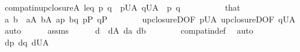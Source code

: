 \begin{isabellebody}
\ {\isachardoublequoteopen}compat{\isacharunderscore}{\kern0pt}in{\isacharparenleft}{\kern0pt}upclosure{\isacharparenleft}{\kern0pt}A{\isacharparenright}{\kern0pt}{\isacharcomma}{\kern0pt}\ leq{\isacharcomma}{\kern0pt}\ p{\isacharcomma}{\kern0pt}\ q{\isacharparenright}{\kern0pt}{\isachardoublequoteclose}\ \ {\isachardoublequoteopen}p{\isasymin}{\isacharquery}{\kern0pt}UA{\isachardoublequoteclose}\ {\isachardoublequoteopen}q{\isasymin}{\isacharquery}{\kern0pt}UA{\isachardoublequoteclose}\ \ p\ q\isanewline
\ \ \isamarkupfalse%
\ {\isacharminus}{\kern0pt}\isanewline
\ \ \ \ \isamarkupfalse%
\ that\isanewline
\ \ \ \ \isamarkupfalse%
\ a\ b\ \ {}{\isacharcolon}{\kern0pt}{\isachardoublequoteopen}a{\isasymin}A{\isachardoublequoteclose}\ {\isachardoublequoteopen}b{\isasymin}A{\isachardoublequoteclose}\ {\isachardoublequoteopen}a{\isasympreceq}p{\isachardoublequoteclose}\ {\isachardoublequoteopen}b{\isasympreceq}q{\isachardoublequoteclose}\ {\isachardoublequoteopen}p{\isasymin}P{\isachardoublequoteclose}\ {\isachardoublequoteopen}q{\isasymin}P{\isachardoublequoteclose}\isanewline
\ \ \ \ \ \ \isamarkupfalse%
\ upclosureD{\isacharbrackleft}{\kern0pt}OF\ {\isacartoucheopen}p{\isasymin}{\isacharquery}{\kern0pt}UA{\isacartoucheclose}{\isacharbrackright}{\kern0pt}\ upclosureD{\isacharbrackleft}{\kern0pt}OF\ {\isacartoucheopen}q{\isasymin}{\isacharquery}{\kern0pt}UA{\isacartoucheclose}{\isacharbrackright}{\kern0pt}\ \isamarkupfalse%
\ auto\isanewline
\ \ \ \ \isamarkupfalse%
\ assms{\isacharparenleft}{\kern0pt}{}{\isacharparenright}{\kern0pt}\isanewline
\ \ \ \ \isamarkupfalse%
\ d\ \ {\isachardoublequoteopen}d{\isasymin}A{\isachardoublequoteclose}\ {\isachardoublequoteopen}d{\isasympreceq}a{\isachardoublequoteclose}\ {\isachardoublequoteopen}d{\isasympreceq}b{\isachardoublequoteclose}\isanewline
\ \ \ \ \ \ \isamarkupfalse%
\ compat{\isacharunderscore}{\kern0pt}in{\isacharunderscore}{\kern0pt}def\ \isamarkupfalse%
\ auto\isanewline
\ \ \ \ \isamarkupfalse%
\ {}\isanewline
\ \ \ \ \isamarkupfalse%
\ {}{\isacharcolon}{\kern0pt}{\isachardoublequoteopen}d{\isasympreceq}p{\isachardoublequoteclose}\ {\isachardoublequoteopen}d{\isasympreceq}q{\isachardoublequoteclose}\ {\isachardoublequoteopen}d{\isasymin}{\isacharquery}{\kern0pt}UA{\isachardoublequoteclose}\isanewline

\end{isabellebody}
